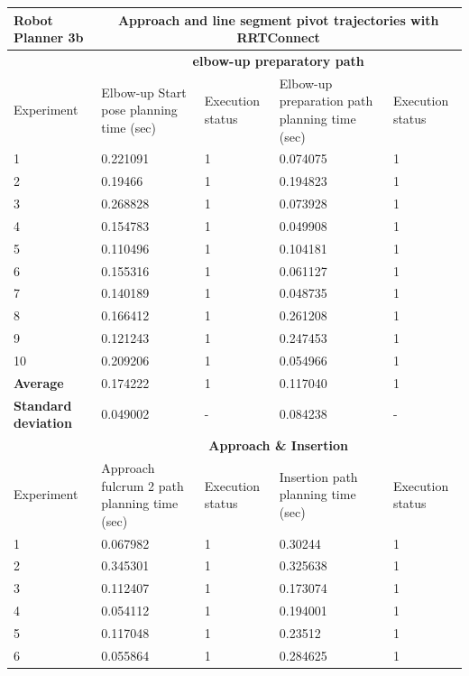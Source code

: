 \begin{longtable}{|p{}|p{}|p{}|p{}|p{}|}
\hline
Robot Planner 3b          & \multicolumn{4}{c}{Approach and \textbf{line segment pivot} trajectories with \textbf{RRTConnect}}                                                                                                 \vline \\
\hline
                          & \multicolumn{4}{c}{\textbf{elbow-up preparatory path}}                     \vline \\
\hline
Experiment                & Elbow-up Start pose planning time (sec) & Execution status & Elbow-up preparation path planning time (sec) & Execution status  \\
\hline
1 & 0.221091 & 1 & 0.074075 & 1 \\
2 & 0.19466 & 1 & 0.194823 & 1 \\
3 & 0.268828 & 1 & 0.073928 & 1 \\
4 & 0.154783 & 1 & 0.049908 & 1 \\
5 & 0.110496 & 1 & 0.104181 & 1 \\
6 & 0.155316 & 1 & 0.061127 & 1 \\
7 & 0.140189 & 1 & 0.048735 & 1 \\
8 & 0.166412 & 1 & 0.261208 & 1 \\
9 & 0.121243 & 1 & 0.247453 & 1 \\
10 & 0.209206 & 1 & 0.054966 & 1 \\
\hline
\textbf{Average} & 0.174222 & 1 & 0.117040	& 1 \\
\hline
\textbf{Standard deviation} & 	0.049002 &	- &	0.084238 & - \\
\hline
                          & \multicolumn{4}{c}{\textbf{Approach \& Insertion}}                     \vline \\
\hline
Experiment                & Approach fulcrum 2 path planning time (sec) & Execution status & Insertion path planning time (sec) & Execution status  \\
\hline
1 & 0.067982 & 1 & 0.30244 & 1 \\
2 & 0.345301 & 1 & 0.325638 & 1 \\
3 & 0.112407 & 1 & 0.173074 & 1 \\
4 & 0.054112 & 1 & 0.194001 & 1 \\
5 & 0.117048 & 1 & 0.23512 & 1 \\
6 & 0.055864 & 1 & 0.284625 & 1 \\

\end{longtable}
